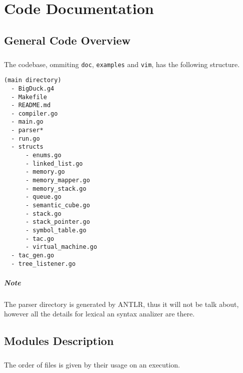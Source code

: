 
\chapter{Code Documentation}

\section{General Code Overview}

\paragraph{} The codebase, ommiting \texttt{doc}, \texttt{examples} and
\texttt{vim}, has the following structure.

\begin{verbatim}
(main directory)
  - BigDuck.g4
  - Makefile
  - README.md
  - compiler.go
  - main.go
  - parser*
  - run.go
  - structs
      - enums.go
      - linked_list.go
      - memory.go
      - memory_mapper.go
      - memory_stack.go
      - queue.go
      - semantic_cube.go
      - stack.go
      - stack_pointer.go
      - symbol_table.go
      - tac.go
      - virtual_machine.go
  - tac_gen.go
  - tree_listener.go
\end{verbatim}

\paragraph{Note} The parser directory is generated by ANTLR, thus it will not
be talk about, however all the details for lexical an syntax analizer are there.

\section{Modules Description}

\paragraph{} The order of files is given by their usage on an execution.

